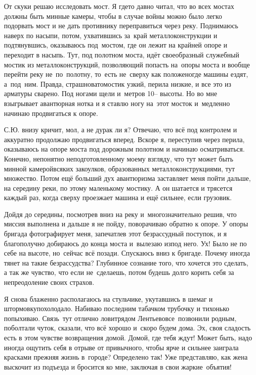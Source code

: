 От скуки решаю исследовать мост. Я где\sdash то давно читал, что во всех мостах должны быть минные камеры, чтобы в случае войны можно было легко подорвать мост и не дать противнику переправиться через реку. Поднимаюсь наверх по насыпи, потом, ухватившись за~край металлоконструкции и подтянувшись, оказываюсь под~мостом, где он лежит на крайней опоре и переходит в насыпь. Тут, под полотном моста, идёт своеобразный служебный мостик из металлоконструкций, позволяющий попасть на~опоры моста и вообще перейти реку не~по~полотну, то~есть не~сверху как положено\mdash где машины ездят, а~под~ним. Правда, страшновато\mdash мостик узкий, перила низкие, и все это из арматуры сварено. Под ногами щели и~метров 10\thinspace\nobreakdash-- высоты. Но во мне взыгрывает авантюрная нотка и я ставлю ногу на~этот мосток и~медленно начинаю продвигаться к опоре. 

С.Ю. внизу кричит, мол, а не дурак ли я? Отвечаю, что всё под контролем и аккуратно продолжаю продвигаться вперед. Вскоре я, переступив через перила, оказываюсь на опоре моста под дорожным полотном и начинаю осматриваться. Конечно, непонятно неподготовленному моему взгляду, что тут может быть минной камерой\mdash всяких закоулков, образованных металлоконструкциями, тут множество. Потом ещё больший дух авантюризма заставляет меня пойти дальше, на середину реки, по этому маленькому мостику. А он шатается и трясется каждый раз, когда сверху проезжает машина и ещё сильнее, если грузовик. 

Дойдя до середины, посмотрев вниз на реку и~многозначительно решив, что миссия выполнена и дальше я не пойду, поворачиваю обратно к опоре. У опоры бригада фотографирует меня, запечатлев этот безрассудный поступок, и я благополучно добираюсь до конца моста и~вылезаю из\sdash под него. Ух! Было не по себе на высоте, но~сейчас всё позади. Спускаюсь вниз к бригаде. Почему иногда тянет на такие безрассудства? Глубинное сознание того, что хочется это сделать, а так же чувство, что если не~сделаешь, потом будешь долго корить себя за непреодоление своих страхов.

Я снова блаженно располагаюсь на стульчике, укутавшись в шемаг и штормовку\mdash похолодало. Набиваю последним табачком трубочку и тихонько попыхиваю. Связь~тут отлично ловит\mdash рядом Лентьево\mdash все~позвонили родным, поболтали чуток, сказали, что всё хорошо и~скоро будем дома. Эх, своя сладость есть в этом чувстве возвращения домой. Домой, где тебя ждут! Может быть, надо иногда ощутить себя в отрыве от привычного, чтобы ярче и сильнее заиграла красками прежняя жизнь в~городе? Определено так! Уже представляю, как жена выскочит из подъезда и бросится ко мне, заключая в свои жаркие~объятия!

